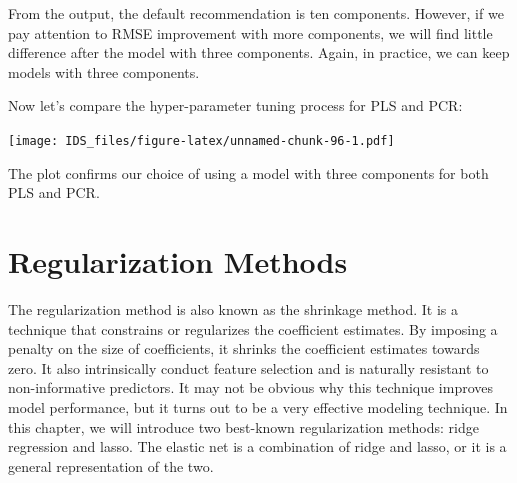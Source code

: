 \documentclass[12pt,]{krantz}
\makeatletter
\newenvironment{Shaded}{\begin{snugshade}}{\end{snugshade}}
\newcommand{\CommentTok}[1]{\textcolor[rgb]{0.37,0.37,0.37}{\textit{#1}}}
\newcommand{\DataTypeTok}[1]{\textcolor[rgb]{0.27,0.27,0.27}{#1}}
\newcommand{\DecValTok}[1]{\textcolor[rgb]{0.06,0.06,0.06}{#1}}
\newcommand{\KeywordTok}[1]{\textcolor[rgb]{0.27,0.27,0.27}{\textbf{#1}}}
\newcommand{\NormalTok}[1]{#1}
\newcommand{\OperatorTok}[1]{\textcolor[rgb]{0.43,0.43,0.43}{\textbf{#1}}}
\newcommand{\StringTok}[1]{\textcolor[rgb]{0.5,0.5,0.5}{#1}}
\newenvironment{kframe}{%
\medskip{}
\setlength{\fboxsep}{.8em}
 \def\at@end@of@kframe{}%
 \ifinner\ifhmode%
  \def\at@end@of@kframe{\end{minipage}}%
  \begin{minipage}{\columnwidth}%
 \fi\fi%
 \def\FrameCommand##1{\hskip\@totalleftmargin \hskip-\fboxsep
 \colorbox{shadecolor}{##1}\hskip-\fboxsep
     \hskip-\linewidth \hskip-\@totalleftmargin \hskip\columnwidth}%
 \MakeFramed {\advance\hsize-\width
   \@totalleftmargin\z@ \linewidth\hsize
   \@setminipage}}%
 {\par\unskip\endMakeFramed%
 \at@end@of@kframe}
\renewenvironment{Shaded}{\begin{kframe}}{\end{kframe}}
\makeatother
\begin{document}
From the output, the default recommendation is ten components. However, if we pay attention to RMSE improvement with more components, we will find little difference after the model with three components. Again, in practice, we can keep models with three components.

Now let's compare the hyper-parameter tuning process for PLS and PCR:

\begin{Shaded}
\end{Shaded}

\texttt{[image: IDS\_files/figure-latex/unnamed-chunk-96-1.pdf]}

The plot confirms our choice of using a model with three components for both PLS and PCR.

\hypertarget{regularization-methods}{%
\chapter{Regularization Methods}\label{regularization-methods}}

The regularization method is also known as the shrinkage method. It is a technique that constrains or regularizes the coefficient estimates. By imposing a penalty on the size of coefficients, it shrinks the coefficient estimates towards zero. It also intrinsically conduct feature selection and is naturally resistant to non-informative predictors. It may not be obvious why this technique improves model performance, but it turns out to be a very effective modeling technique. In this chapter, we will introduce two best-known regularization methods: ridge regression and lasso. The elastic net is a combination of ridge and lasso, or it is a general representation of the two.
\end{document}
